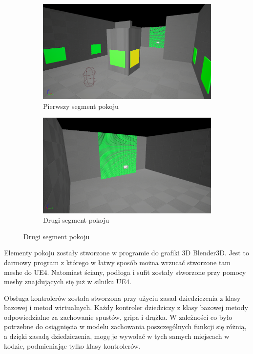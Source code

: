 \documentclass[a4paper,12pt,reqno]{article}
\begin{document}
\begin{figure}[H]%
	\centering
	\begin{subfigure}{.5\textwidth}
		\centering
		\includegraphics[width=0.8\linewidth]{graphics/05/GalleryRoom.png}
		\caption{Pierwszy segment pokoju }	
		\label{ref:subref_a}
	\end{subfigure}%
	\begin{subfigure}{.5\textwidth}
		\centering
		\includegraphics[width=0.8\linewidth]{graphics/05/GalleryRoom2.png}
		\caption{Drugi segment pokoju}
		\label{ref:subref_b}
	\end{subfigure}%
\label{ref:ref}
\end{figure}

Elementy pokoju zostały stworzone w programie do grafiki 3D Blender3D. Jest to darmowy program z którego w łatwy sposób można wrzucać stworzone tam meshe do UE4.
Natomiast ściany, podłoga i sufit zostały stworzone przy pomocy meshy znajdujących się już w silniku UE4.

{\color{red}
Obsługa kontrolerów została stworzona przy użyciu zasad dziedziczenia z klasy bazowej i metod wirtualnych. Każdy kontroler dziedziczy z klasy bazowej metody odpowiedzialne za zachowanie spustów, gripa i drążka. W zależności co było potrzebne do osiągnięcia w modelu zachowania poszczególnych funkcji się różnią, a dzięki zasadą dziedziczenia, mogę je wywołać w tych samych miejscach w kodzie, podmieniając tylko klasy kontrolerów.
}
\end{document}
